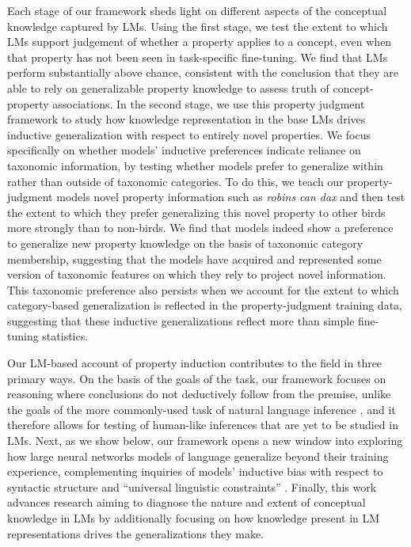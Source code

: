 \documentclass[10pt,letterpaper]{article}
\newcommand{\ake}[1]{\textcolor{blue}{$_{AE}$[#1]}}
\begin{document}
Each stage of our framework sheds light on different aspects of the conceptual knowledge captured by LMs.
Using the first stage, we test the extent to which LMs support judgement of whether a property applies to a concept, even when that property has not been seen in task-specific fine-tuning. 
We find that LMs perform substantially above chance, consistent with the conclusion that they are able to rely on generalizable property knowledge to assess truth of concept-property associations.
In the second stage, we use this property judgment framework to study how knowledge representation in the base LMs drives inductive generalization with respect to entirely novel properties. We focus specifically on whether models' inductive preferences indicate reliance on taxonomic information, by testing whether models prefer to generalize within rather than outside of taxonomic categories. To do this, we teach our property-judgment models novel property information such as \textit{robins can dax} and then test the extent to which they prefer generalizing this novel property to other birds
more strongly than to non-birds.
We find that models indeed show a preference to generalize new property knowledge on the basis of taxonomic category membership, suggesting that the models have acquired and represented some version of taxonomic features on which they rely to project novel information.
This taxonomic preference also persists when we account for the extent to which category-based generalization is reflected in the property-judgment training data, suggesting that these inductive generalizations reflect more than simple fine-tuning statistics.

Our LM-based account of property induction contributes to the field in three primary ways. 
On the basis of the goals of the task, our framework focuses on reasoning where conclusions do not deductively follow from the premise, unlike the goals of the more commonly-used task of natural language inference \citep{bowman2015large}, and it therefore allows for testing of human-like inferences that are yet to be studied in LMs.
Next, as we show below, our framework opens a new window into exploring how large neural networks models of language generalize beyond their training experience, complementing inquiries of models' inductive bias with respect to syntactic structure \citep{mccoy2020does} and ``universal linguistic constraints'' \citep{mccoy2020universal}. Finally, this work advances research aiming to diagnose the nature and extent of conceptual knowledge in LMs \citep{da-kasai-2019-cracking,forbes2019neural,weir2020probing, bhatia2020transformer} by additionally focusing on how knowledge present in LM representations drives the generalizations they make.
\end{document}
